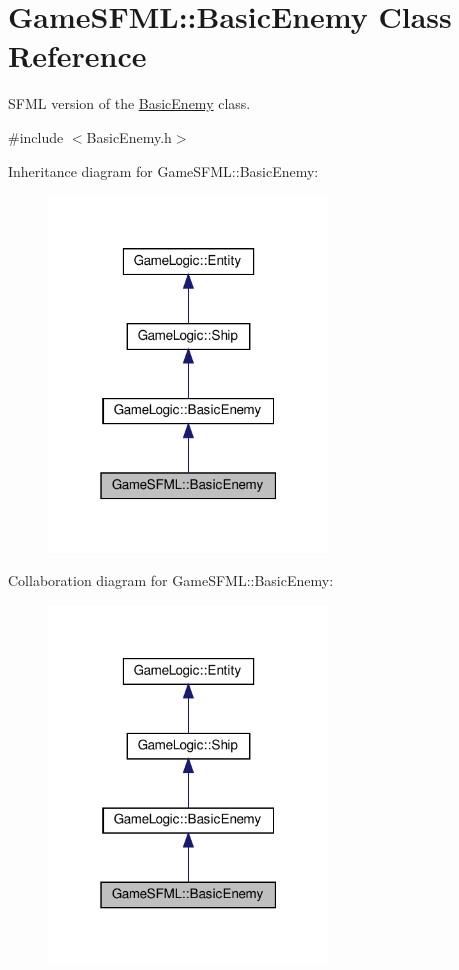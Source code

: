 \hypertarget{classGameSFML_1_1BasicEnemy}{}\section{Game\+S\+F\+ML\+:\+:Basic\+Enemy Class Reference}
\label{classGameSFML_1_1BasicEnemy}


S\+F\+ML version of the \hyperlink{classGameSFML_1_1BasicEnemy}{Basic\+Enemy} class.  




{\ttfamily \#include $<$Basic\+Enemy.\+h$>$}



Inheritance diagram for Game\+S\+F\+ML\+:\+:Basic\+Enemy\+:\nopagebreak
\begin{figure}[H]
\begin{center}
\leavevmode
\includegraphics[width=211pt]{classGameSFML_1_1BasicEnemy__inherit__graph}
\end{center}
\end{figure}


Collaboration diagram for Game\+S\+F\+ML\+:\+:Basic\+Enemy\+:\nopagebreak
\begin{figure}[H]
\begin{center}
\leavevmode
\includegraphics[width=211pt]{classGameSFML_1_1BasicEnemy__coll__graph}
\end{center}
\end{figure}
